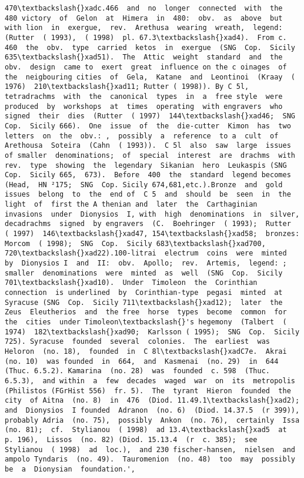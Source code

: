 \documentclass[11pt]{article}
\begin{document}
\begin{Verbatim}[commandchars=\\\{\}]
470\textbackslash{}xadc.466  and  no  longer  connected  with  the  480 victory  of  Gelon  at  Himera  in  480:  obv.  as  above  but  with lion  in  exergue,  rev.  Arethusa  wearing  wreath,  legend: (Rutter  ( 1993),  ( 1998)  pl. 67.3\textbackslash{}xad4).  From c. 460  the  obv.  type  carried  ketos  in  exergue  (SNG  Cop.  Sicily 635\textbackslash{}xad51).  The  Attic  weight  standard  and  the  obv.  design  came to  exert  great  influence on the c oinages  of  the  neigbouring cities  of  Gela,  Katane  and  Leontinoi  (Kraay  ( 1976)  210\textbackslash{}xad11; Rutter ( 1998)). By C 5l,  tetradrachms  with  the  canonical  types  in  a  free style  were  produced  by  workshops  at  times  operating  with engravers  who  signed  their  dies  (Rutter  ( 1997)  144\textbackslash{}xad46;  SNG Cop.  Sicily 666).  One  issue  of  the  die-cutter  Kimon  has  two letters  on  the  obv.: ,  possibly  a  reference  to a  cult  of Arethousa  Soteira  (Cahn  ( 1993)).  C 5l  also  saw  large  issues  of smaller  denominations;  of  special  interest  are  drachms  with rev.  type  showing  the  legendary  Sikanian  hero  Leukaspis (SNG  Cop.  Sicily 665,  673).  Before  400  the  standard  legend becomes  (Head,  HN ²175;  SNG  Cop. Sicily 674,681,etc.).Bronze  and  gold  issues  belong  to  the  end of  C 5  and  should  be  seen  in  the  light  of  first the A thenian and  later  the  Carthaginian  invasions  under  Dionysios  I, with  high  denominations  in  silver,  decadrachms  signed  by engravers  (C.  Boehringer  ( 1993);  Rutter  ( 1997)  146\textbackslash{}xad47, 154\textbackslash{}xad58;  bronzes:  Morcom  ( 1998);  SNG  Cop.  Sicily 683\textbackslash{}xad700, 720\textbackslash{}xad22).100-litrai  electrum  coins  were  minted  by  Dionysios I  and  II:  obv.  Apollo;  rev.  Artemis,  legend: ; smaller  denominations  were  minted  as  well  (SNG  Cop.  Sicily 701\textbackslash{}xad10).  Under  Timoleon  the  Corinthian  connection  is underlined  by  Corinthian-type  pegasi  minted  at  Syracuse (SNG  Cop.  Sicily 711\textbackslash{}xad12);  later  the  Zeus  Eleutherios  and  the free  horse  types  become  common  for  the  cities  under Timoleon\textbackslash{}'s hegemony  (Talbert  ( 1974)  182\textbackslash{}xad90;  Karlsson ( 1995);  SNG  Cop.  Sicily 725). Syracuse  founded  several  colonies.  The  earliest  was Heloron  (no. 18),  founded  in  C 8l\textbackslash{}xadC7e.  Akrai  (no. 10)  was founded  in  664,  and  Kasmenai  (no. 29)  in  644  (Thuc. 6.5.2). Kamarina  (no. 28)  was  founded  c. 598  (Thuc. 6.5.3),  and within  a  few  decades  waged  war  on  its  metropolis  (Philistos (FGrHist 556)  fr. 5).  The  tyrant  Hieron  founded  the  city  of Aitna  (no. 8)  in  476  (Diod. 11.49.1\textbackslash{}xad2);  and  Dionysios  I founded  Adranon  (no. 6)  (Diod. 14.37.5  (r 399)),  probably Adria  (no. 75),  possibly  Ankon  (no. 76),  certainly  Issa  (no. 81);  cf.  Stylianou  ( 1998)  ad 13.4\textbackslash{}xad5  at  p. 196),  Lissos  (no. 82) (Diod. 15.13.4  (r  c. 385);  see  Stylianou  ( 1998)  ad  loc.),  and 230 fischer-hansen,  nielsen  and  ampolo Tyndaris  (no. 49).  Tauromenion  (no. 48)  too  may  possibly be  a  Dionysian  foundation.',

\end{Verbatim}
\end{document}
